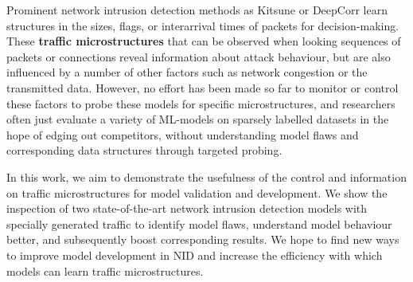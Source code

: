 \documentclass[conference]{IEEEtran}
\begin{document}

Prominent network intrusion detection methods as Kitsune \cite{mirsky2018kitsune} or DeepCorr \cite{nasr2018deepcorr} learn structures in the sizes, flags, or interarrival times of packets for decision-making. These \textbf{traffic microstructures} that can be observed when looking sequences of packets or connections reveal information about attack behaviour, but are also influenced by a number of other factors such as network congestion or the transmitted data. However, no effort has been made so far to monitor or control these factors to probe these models for specific microstructures, and researchers often just evaluate a variety of ML-models on sparsely labelled datasets in the hope of edging out competitors, without understanding model flaws and corresponding data structures through targeted probing.

In this work, we aim to demonstrate the usefulness of the control and information on traffic microstructures for model validation and development. We show the inspection of two state-of-the-art network intrusion detection models with specially generated traffic to identify model flaws, understand model behaviour better, and subsequently boost corresponding results. We hope to find new ways to improve model development in NID and increase the efficiency with which models can learn traffic microstructures.
\end{document}
